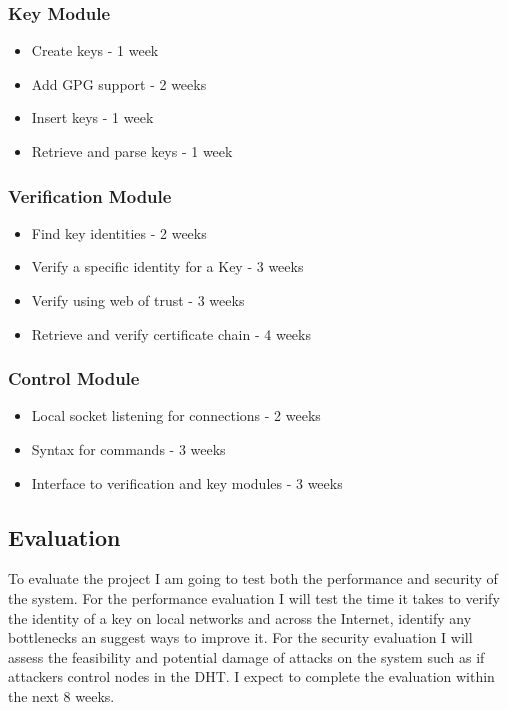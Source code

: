 \documentclass[10pt, a4paper]{article}
\begin{document}
\subsubsection{Key Module}
\begin{itemize}[noitemsep]
  \item Create keys - 1 week
  \item Add GPG support - 2 weeks
  \item Insert keys - 1 week
  \item Retrieve and parse keys - 1 week
\end{itemize}
\subsubsection{Verification Module}
\begin{itemize}[noitemsep]
  \item Find key identities - 2 weeks
  \item Verify a specific identity for a Key - 3 weeks
  \item Verify using web of trust - 3 weeks
  \item Retrieve and verify certificate chain - 4 weeks
\end{itemize}
\subsubsection{Control Module}
\begin{itemize}[noitemsep]
  \item Local socket listening for connections - 2 weeks
  \item Syntax for commands - 3 weeks
  \item Interface to verification and key modules - 3 weeks
\end{itemize}
\subsection{Evaluation}
To evaluate the project I am going to test both the performance and security of the system. For the performance evaluation I will test the time it takes to verify the identity of a key on local networks and across the Internet, identify any bottlenecks an suggest ways to improve it. For the security evaluation I will assess the feasibility and potential damage of attacks on the system such as if attackers control nodes in the DHT\@. I expect to complete the evaluation within the next 8 weeks.
\end{document}
